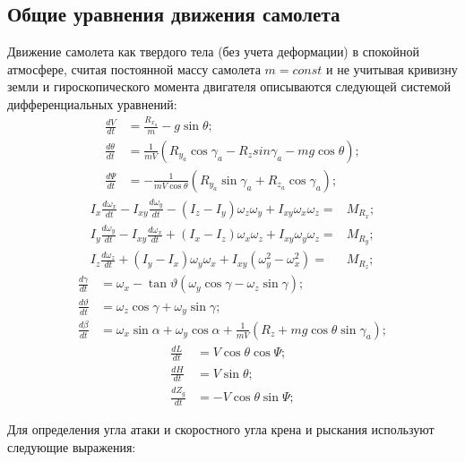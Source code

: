 \documentclass{article}
\begin{document}
\subsection{Общие уравнения движения самолета}
Движение самолета как твердого тела (без учета деформации) в спокойной
атмосфере, считая постоянной массу самолета $m=const$ и не учитывая кривизну
земли и гироскопического момента двигателя описываются следующей системой
дифференциальных уравнений:
\begin{align*}
	\frac{dV}{dt}      & = \frac{R_{x_a}}{m} - g \sin{\theta};
	\\
	\frac{d\theta}{dt} & = \frac{1}{mV}(R_{y_a} \cos{\gamma_a} - R_{z}
	sin{\gamma_a} - mg \cos{\theta});                                           \\
	\frac{d\Psi}{dt}   & = -\frac{1}{mV \cos{\theta}} (R_{y_a} \sin{\gamma_a} +
	R_{z_a} \cos{\gamma_a});
\end{align*}
\begin{align*}
	I_x \frac{d\omega_x}{dt} - I_{xy} \frac{d\omega_y}{dt} - (I_z - I_y)
	\omega_z \omega_y + I_{xy} \omega_x \omega_z = & M_{R_x}; \\
	I_y \frac{d\omega_y}{dt} - I_{xy} \frac{d\omega_x}{dt} + (I_x - I_z)
	\omega_x \omega_z + I_{xy} \omega_y \omega_z = & M_{R_y}; \\
	I_z \frac{d\omega_z}{dt} + (I_y - I_x) \omega_y \omega_x +
	I_{xy}(\omega_y^2 - \omega_x^2) =              & M_{R_z};
\end{align*}
\begin{align*}
	\frac{d\gamma}{dt}    & = \omega_x - \tan{\vartheta}(\omega_y \cos{\gamma}
	- \omega_z \sin{\gamma});                                                  \\
	\frac{d\vartheta}{dt} & = \omega_z \cos{\gamma} + \omega_y \sin{\gamma};
	\\
	\frac{d\beta}{dt}     & = \omega_x \sin{\alpha} + \omega_y \cos{\alpha} +
	\frac{1}{mV}(R_z + mg \cos{\theta} \sin{\gamma_a});
\end{align*}
\begin{align*}
	\frac{dL}{dt}   & = V\cos{\theta} \cos{\Psi};    \\
	\frac{dH}{dt}   & = V\sin{\theta};               \\
	\frac{dZ_g}{dt} & = - V \cos{\theta} \sin{\Psi};
\end{align*}

Для определения угла атаки и скоростного угла крена и рыскания используют
следующие выражения:
\end{document}
